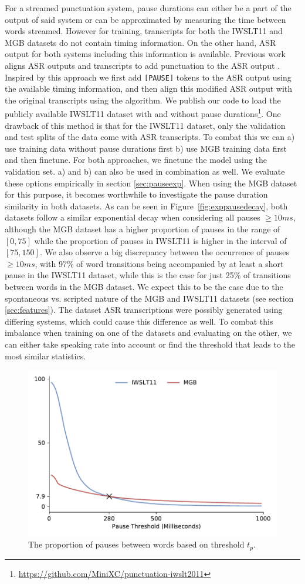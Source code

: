 \documentclass[bsc,deptreport,ai]{infthesis} %
\begin{document}
For a streamed punctuation system, pause durations can either be a part of the output of said system or can be approximated by measuring the time between words streamed. However for training, transcripts for both the IWSLT11 and MGB datasets do not contain timing information. On the other hand, ASR output for both systems including this information is available. Previous work aligns ASR outputs and transcripts to add punctuation to the ASR output \citep{yi2019speech2vec}. Inspired by this approach we first add \texttt{[PAUSE]} tokens to the ASR output using the available timing information, and then align this modified ASR output with the original transcripts using the \citet{needleman1970} algorithm. We publish our code to load the publicly available IWSLT11 dataset with and without pause durations\footnote{\url{https://github.com/MiniXC/punctuation-iwslt2011}}.
One drawback of this method is that for the IWSLT11 dataset, only the validation and test splits of the data come with ASR transcripts. To combat this we can a) use training data without pause durations first b) use MGB training data first and then finetune. For both approaches, we finetune the model using the validation set. a) and b) can also be used in combination as well. We evaluate these options empirically in section \ref{sec:pauseexp}. When using the MGB dataset for this purpose, it becomes worthwhile to investigate the pause duration similarity in both datasets. As can be seen in Figure~\ref{fig:exppausedecay}, both datasets follow a similar exponential decay when considering all pauses $\geq 10ms$, although the MGB dataset has a higher proportion of pauses in the range of $[0, 75]$ while the proportion of pauses in IWSLT11 is higher in the interval of $[75,150]$. We also observe a big discrepancy between the occurrence of pauses $\geq 10ms$, with 97\% of word transitions being accompanied by at least a short pause in the IWSLT11 dataset, while this is the case for just 25\% of transitions between words in the MGB dataset. We expect this to be the case due to the spontaneous vs. scripted nature of the MGB and IWSLT11 datasets (see section \ref{sec:features}). The dataset ASR transcriptions were possibly generated using differing systems, which could cause this difference as well. To combat this imbalance when training on one of the datasets and evaluating on the other, we can either take speaking rate into account or find the threshold that leads to the most similar statistics.
\begin{figure}
\centering
\includegraphics[width=.7\textwidth]{pause_threshold.pdf}
\caption{The proportion of pauses between words based on threshold $t_p$.}
\label{fig:idealthreshold}
\end{figure}
\end{document}
